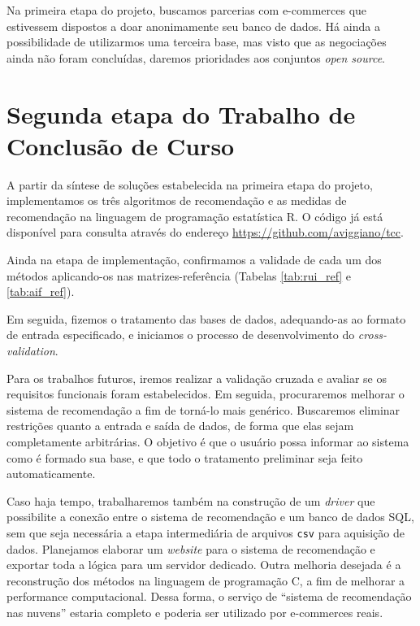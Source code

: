 Na primeira etapa do projeto, buscamos parcerias com e-commerces que estivessem dispostos a doar anonimamente seu banco de dados. Há ainda a possibilidade de utilizarmos uma terceira base, mas visto que as negociações ainda não foram concluídas, daremos prioridades aos conjuntos \textit{open source}.  

\section{Segunda etapa do Trabalho de Conclusão de Curso} %
\label{sec:segunda_etapa_do_trabalho_de_conclus_o_de_curso}


A partir da síntese de soluções estabelecida na primeira etapa do projeto, implementamos os três algoritmos de recomendação e as medidas de recomendação na linguagem de programação estatística R. O código já está disponível para consulta através do endereço \url{https://github.com/aviggiano/tcc}.

Ainda na etapa de implementação, confirmamos a validade de cada um dos métodos aplicando-os nas matrizes-referência (Tabelas \ref{tab:rui_ref} e \ref{tab:aif_ref}). 

Em seguida, fizemos o tratamento das bases de dados, adequando-as ao formato de entrada especificado, e  iniciamos o processo de desenvolvimento do \textit{cross-validation}.

Para os trabalhos futuros, iremos realizar a validação cruzada e avaliar se os requisitos funcionais foram estabelecidos. Em seguida, procuraremos melhorar o sistema de recomendação a fim de torná-lo mais genérico. Buscaremos eliminar restrições quanto a entrada e saída de dados, de forma que elas sejam completamente arbitrárias. O objetivo é que o usuário possa informar ao sistema como é formado sua base, e que todo o tratamento preliminar seja feito automaticamente. 

Caso haja tempo, trabalharemos também na construção de um \textit{driver} que possibilite a conexão entre o sistema de recomendação e um banco de dados SQL, sem que seja necessária a etapa intermediária de arquivos \texttt{csv} para aquisição de dados. Planejamos elaborar um \textit{website} para o sistema de recomendação e exportar toda a lógica para um servidor dedicado. Outra melhoria desejada é a reconstrução dos métodos na linguagem de programação C, a fim de melhorar a performance computacional. Dessa forma, o serviço de ``sistema de recomendação nas nuvens'' estaria completo e poderia ser utilizado por e-commerces reais.